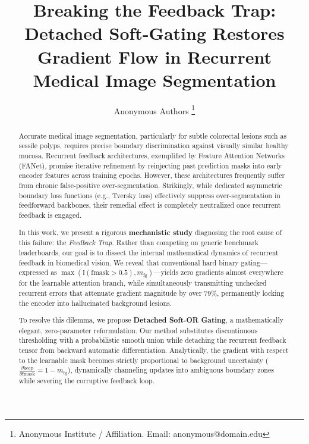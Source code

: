 \documentclass[journal, 10pt]{IEEEtran}
\begin{document}
\title{Breaking the Feedback Trap: Detached Soft-Gating Restores Gradient
       Flow in Recurrent Medical Image Segmentation}

\author{%
  Anonymous Authors%
  \thanks{Anonymous Institute / Affiliation. Email: anonymous@domain.edu}%
}

\maketitle

\begin{abstract}
Accurate medical image segmentation, particularly for subtle colorectal
lesions such as sessile polyps, requires precise boundary discrimination
against visually similar healthy mucosa. Recurrent feedback architectures,
exemplified by Feature Attention Networks (FANet), promise iterative
refinement by reinjecting past prediction masks into early encoder features
across training epochs. However, these architectures frequently suffer from
chronic false-positive over-segmentation. Strikingly, while dedicated
asymmetric boundary loss functions (e.g., Tversky loss) effectively suppress
over-segmentation in feedforward backbones, their remedial effect is
completely neutralized once recurrent feedback is engaged.

In this work, we present a rigorous \textbf{mechanistic study} diagnosing
the root cause of this failure: the \textit{Feedback Trap}. Rather than
competing on generic benchmark leaderboards, our goal is to dissect the
internal mathematical dynamics of recurrent feedback in biomedical vision.
We reveal that conventional hard binary gating---expressed as
$\max(\mathbb{I}(\text{fmask} > 0.5), m_{\text{fg}})$---yields zero
gradients almost everywhere for the learnable attention branch, while
simultaneously transmitting unchecked recurrent errors that attenuate
gradient magnitude by over $79\%$, permanently locking the encoder into
hallucinated background lesions.

To resolve this dilemma, we propose \textbf{Detached Soft-OR Gating}, a
mathematically elegant, zero-parameter reformulation. Our method substitutes
discontinuous thresholding with a probabilistic smooth union while detaching
the recurrent feedback tensor from backward automatic differentiation.
Analytically, the gradient with respect to the learnable mask becomes
strictly proportional to background uncertainty
($\frac{\partial \text{keep}}{\partial \text{fmask}} = 1 - m_{\text{fg}}$),
dynamically channeling updates into ambiguous boundary zones while severing
the corruptive feedback loop.


\end{abstract}
\end{document}

